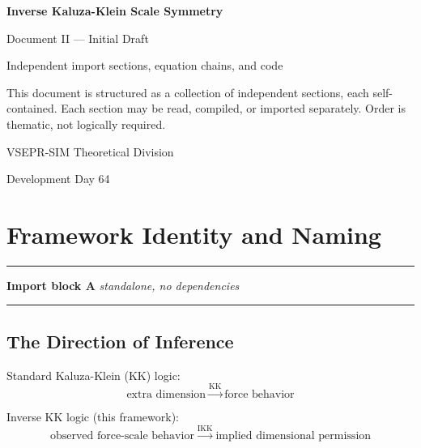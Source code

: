 \documentclass[11pt, a4paper, oneside]{article}
\theoremstyle{definition}
\theoremstyle{plain}
\theoremstyle{remark}
\begin{document}
\begin{titlepage}
  \centering
  \vspace*{2cm}
  {\Huge\bfseries Inverse Kaluza-Klein Scale Symmetry\par}
  \vspace{0.8cm}
  {\LARGE Document II --- Initial Draft\par}
  \vspace{0.5cm}
  {\Large Independent import sections, equation chains, and code\par}
  \vspace{1.5cm}
  {\normalsize
	This document is structured as a collection of independent sections,
	each self-contained. Each section may be read, compiled, or imported
	separately. Order is thematic, not logically required.
  \par}
  \vspace{1.5cm}
  {\large VSEPR-SIM Theoretical Division\par}
  {\large Development Day 64\par}
\end{titlepage}

\tableofcontents
\newpage

\section{Framework Identity and Naming}
\label{sec:naming}

\noindent\rule{\linewidth}{0.8pt}
\textbf{Import block A} \hfill \textit{standalone, no dependencies}
\noindent\rule{\linewidth}{0.4pt}

\subsection*{The Direction of Inference}

Standard Kaluza-Klein (KK) logic:
\begin{equation}
  \text{extra dimension}
  \;\xrightarrow{\text{KK}}\;
  \text{force behavior}
  \tag{A.1}
\end{equation}

Inverse KK logic (this framework):
\begin{equation}
  \boxed{
	\text{observed force-scale behavior}
	\;\xrightarrow{\text{IKK}}\;
	\text{implied dimensional permission}
  }
  \tag{A.2}
\end{equation}
\end{document}
